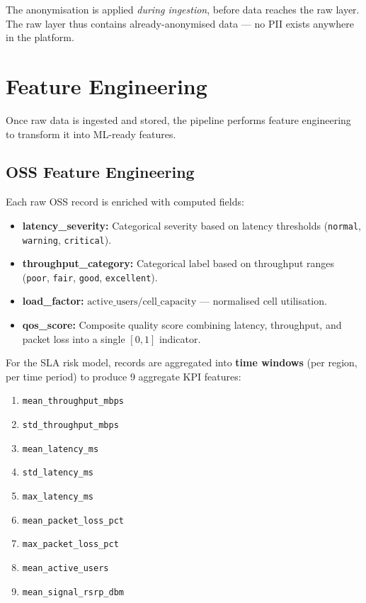The anonymisation is applied \emph{during ingestion}, before data reaches the raw layer. The raw layer thus contains already-anonymised data --- no PII exists anywhere in the platform.

\section{Feature Engineering}

Once raw data is ingested and stored, the pipeline performs feature engineering to transform it into ML-ready features.

\subsection{OSS Feature Engineering}

Each raw OSS record is enriched with computed fields:

\begin{itemize}
  \item \textbf{latency\_severity:} Categorical severity based on latency thresholds (\texttt{normal}, \texttt{warning}, \texttt{critical}).
  \item \textbf{throughput\_category:} Categorical label based on throughput ranges (\texttt{poor}, \texttt{fair}, \texttt{good}, \texttt{excellent}).
  \item \textbf{load\_factor:} $\text{active\_users} / \text{cell\_capacity}$ --- normalised cell utilisation.
  \item \textbf{qos\_score:} Composite quality score combining latency, throughput, and packet loss into a single $[0, 1]$ indicator.
\end{itemize}

For the SLA risk model, records are aggregated into \textbf{time windows} (per region, per time period) to produce 9 aggregate KPI features:

\begin{enumerate}
  \item \texttt{mean\_throughput\_mbps}
  \item \texttt{std\_throughput\_mbps}
  \item \texttt{mean\_latency\_ms}
  \item \texttt{std\_latency\_ms}
  \item \texttt{max\_latency\_ms}
  \item \texttt{mean\_packet\_loss\_pct}
  \item \texttt{max\_packet\_loss\_pct}
  \item \texttt{mean\_active\_users}
  \item \texttt{mean\_signal\_rsrp\_dbm}
\end{enumerate}

